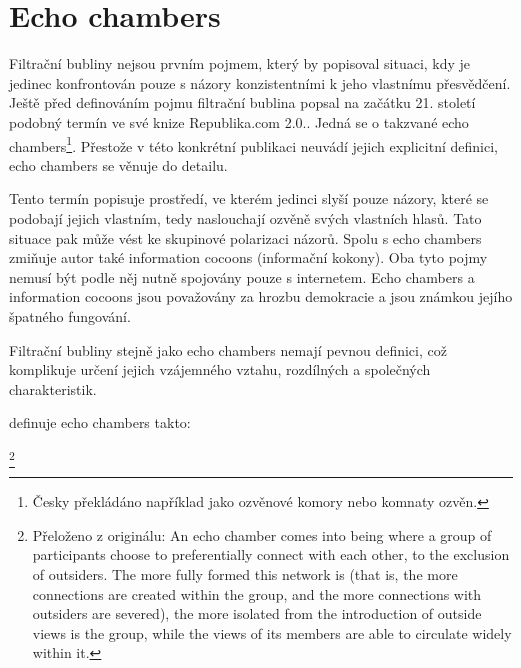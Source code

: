     \setlength\parskip{0mm}

\section{Echo chambers}
\label{section:echo-chambers}
    Filtrační bubliny nejsou prvním pojmem, který by popisoval situaci, kdy je jedinec konfrontován pouze s názory konzistentními k jeho vlastnímu přesvědčení. Ještě před definováním pojmu filtrační bublina popsal na začátku 21. století~\cite{Sunstein07} podobný termín ve své knize Republika.com 2.0.. Jedná se o takzvané echo chambers\footnote{Česky překládáno například jako ozvěnové komory nebo komnaty ozvěn.}. Přestože v této konkrétní publikaci neuvádí jejich explicitní definici, echo chambers se věnuje do detailu.
    
    Tento termín popisuje prostředí, ve kterém jedinci slyší pouze názory, které se podobají jejich vlastním, tedy naslouchají ozvěně svých vlastních hlasů. Tato situace pak může vést ke skupinové polarizaci názorů. Spolu s echo chambers zmiňuje autor také information cocoons (informační kokony). Oba tyto pojmy nemusí být podle něj nutně spojovány pouze s internetem. Echo chambers a information cocoons jsou považovány za hrozbu demokracie a jsou známkou jejího špatného fungování.
    \cite{Sunstein17}
    
    Filtrační bubliny stejně jako echo chambers nemají pevnou definici, což komplikuje určení jejich vzájemného vztahu, rozdílných a společných charakteristik.~\cite{Bruns} 
    
    \cite{Bruns17} definuje echo chambers takto:
    
    \setlength\parskip{5mm}
    
    \footnote{Přeloženo z originálu: An echo chamber comes into being where a group of participants choose to preferentially connect with each other, to the exclusion of outsiders. The more fully formed this network is (that is, the more connections are created within the group, and the more connections with outsiders are severed), the more isolated from the introduction of outside views is the group, while the views of its members are able to circulate widely within it.}
    

